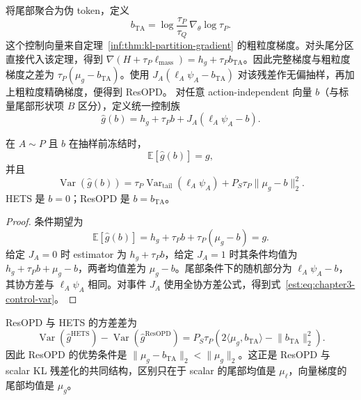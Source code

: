 \documentclass[lang=cn,scheme=chinese,openany]{../book/elegantbook}
\newcommand{\E}{\mathbb E}
\newcommand{\Var}{\operatorname{Var}}
\newcommand{\tail}{\mathrm{tail}}
\begin{document}
将尾部聚合为伪 token，定义
\begin{equation}
 b_{\mathrm{TA}}=\log\frac{\tau_P}{\tau_Q}\,\nabla_\theta\log\tau_P.
 \label{est:eq:chapter3-resopd-control}
\end{equation}
这个控制向量来自定理~\ref{inf:thm:kl-partition-gradient} 的粗粒度梯度。对头尾分区直接代入该定理，得到 $\nabla(H+\tau_P\ell_{\mathrm{mass}})=h_g+\tau_Pb_{\mathrm{TA}}$。因此完整梯度与粗粒度梯度之差为 $\tau_P(\mu_g-b_{\mathrm{TA}})$。使用 $J_A(\ell_A\psi_A-b_{\mathrm{TA}})$ 对该残差作无偏抽样，再加上粗粒度精确梯度，便得到 ResOPD。
对任意 action-independent 向量 $b$（与标量尾部形状项 $B$ 区分），定义统一控制族
\begin{equation}
 \widehat g(b)=h_g+\tau_Pb+J_A(\ell_A\psi_A-b).
 \label{est:eq:chapter3-control-family}
\end{equation}

\begin{theorem}
\label{est:thm:chapter3-resopd}
在 $A\sim P$ 且 $b$ 在抽样前冻结时，
\begin{equation*}
 \E[\widehat g(b)]=g,
\end{equation*}
并且
\begin{equation}
 \Var(\widehat g(b))
 =\tau_P\Var_{\tail}(\ell_A\psi_A)
  +P_S\tau_P\lVert\mu_g-b\rVert_2^2.
 \label{est:eq:chapter3-control-var}
\end{equation}
HETS 是 $b=0$；ResOPD 是 $b=b_{\mathrm{TA}}$。
\end{theorem}

\begin{proof}
条件期望为
\begin{equation*}
 \E[\widehat g(b)]
 =h_g+\tau_Pb+\tau_P(\mu_g-b)=g.
\end{equation*}
给定 $J_A=0$ 时 estimator 为 $h_g+\tau_Pb$，给定 $J_A=1$ 时其条件均值为 $h_g+\tau_Pb+\mu_g-b$，两者均值差为 $\mu_g-b$。尾部条件下的随机部分为 $\ell_A\psi_A-b$，其协方差与 $\ell_A\psi_A$ 相同。对事件 $J_A$ 使用全协方差公式，得到式~\eqref{est:eq:chapter3-control-var}。
\end{proof}

ResOPD 与 HETS 的方差差为
\begin{equation}
 \Var(\widehat g^{\mathrm{HETS}})-\Var(\widehat g^{\mathrm{ResOPD}})
 =P_S\tau_P\left(2\langle\mu_g,b_{\mathrm{TA}}\rangle-\lVert b_{\mathrm{TA}}\rVert_2^2\right).
 \label{est:eq:chapter3-hets-resopd-gap}
\end{equation}
因此 ResOPD 的优势条件是
$\lVert\mu_g-b_{\mathrm{TA}}\rVert_2<\lVert\mu_g\rVert_2$。这正是 ResOPD 与 scalar KL 残差化的共同结构，区别只在于 scalar 的尾部均值是 $\mu_\ell$，向量梯度的尾部均值是 $\mu_g$。
\end{document}
